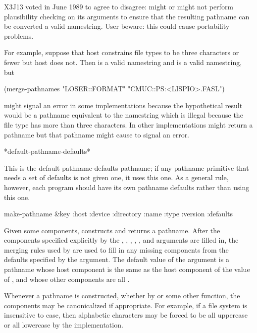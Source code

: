 \begin{defun}[Function]
\begin{newer}
X3J13 voted in June 1989  to agree to disagree:
 might or might not perform plausibility checking
on its arguments to ensure that the resulting pathname can be converted
a valid namestring.  User beware: this could cause portability problems.

For example, suppose that host  constrains file types to be three characters
or fewer but host  does not.  Then  is a valid
namestring and  is a valid namestring, but
\begin{lisp}
(merge-pathnames "LOSER::FORMAT" "CMUC::PS:<LISPIO>.FASL")
\end{lisp}
might signal an error in some implementations because the hypothetical result would be a pathname
equivalent to the namestring  which is illegal
because the file type  has more than three characters.
In other implementations  might return a pathname but that pathname might
cause  to signal an error.
\end{newer}
\end{defun}

\begin{defun}[Variable]
*default-pathname-defaults*

This is the default pathname-defaults pathname; if any pathname primitive
that needs a set of defaults is not given one, it uses this one.
As a general rule, however, each program
should have its own pathname defaults rather than using this one.
\end{defun}

\begin{obsolete}
\begin{defun}[Function]
make-pathname &key :host :device :directory :name :type :version :defaults

Given some components, 
constructs and returns a pathname.  After the components specified
explicitly by the , , ,
, , and  arguments are filled in,
the merging rules used by  are used to fill
in any missing components from the defaults specified by the
 argument.
The default value of the
 argument is a pathname whose host component
is the same as the host component of the value of
, and whose other components
are all {\nil}.

Whenever a pathname is constructed, whether by  or some
other function, the components may be canonicalized if appropriate.
For example, if a file system is insensitive to case, then
alphabetic characters may be forced to be all uppercase or all lowercase
by the implementation.
\end{defun}
\end{obsolete}

